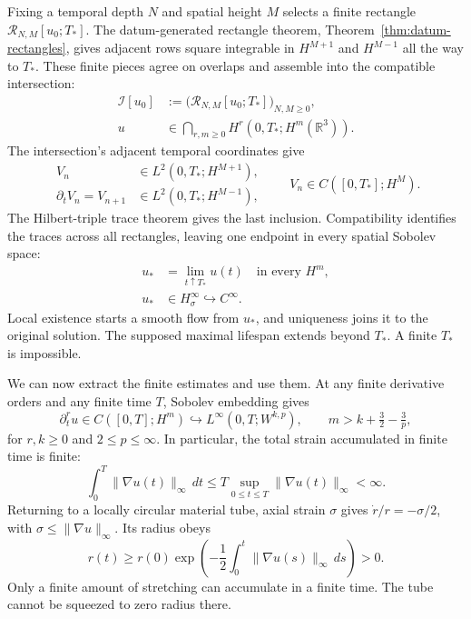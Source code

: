 Fixing a temporal depth \(N\) and spatial height \(M\) selects a finite
rectangle \(\mathcal R_{N,M}[u_0;T_*]\). The datum-generated rectangle
theorem, Theorem~\ref{thm:datum-rectangles}, gives adjacent rows square
integrable in \(H^{M+1}\) and \(H^{M-1}\) all the way to \(T_*\).
These finite pieces agree
on overlaps and assemble into the compatible intersection:
\[
 \begin{aligned}
 \mathcal I[u_0]
 &:=\bigl(\mathcal R_{N,M}[u_0;T_*]\bigr)_{N,M\ge0},\\
 u&\in\bigcap_{r,m\ge0}H^r(0,T_*;H^m(\mathbb R^3)).
 \end{aligned}
\]
The intersection's adjacent temporal coordinates give
\[
 \begin{aligned}
 V_n&\in L^2(0,T_*;H^{M+1}),\\
 \partial_tV_n=V_{n+1}&\in L^2(0,T_*;H^{M-1}),
 \end{aligned}
 \qquad
 V_n\in C([0,T_*];H^M).
\]
The Hilbert-triple trace theorem gives the last inclusion. Compatibility
identifies the traces across all rectangles, leaving one endpoint in every
spatial Sobolev space:
\[
 \begin{aligned}
 u_*&=\lim_{t\uparrow T_*}u(t)\quad\text{in every }H^m,\\
 u_*&\in H^\infty_\sigma\hookrightarrow C^\infty.
 \end{aligned}
\]
Local existence starts a smooth flow from \(u_*\), and uniqueness joins
it to the original solution. The supposed maximal lifespan extends
beyond \(T_*\). A finite \(T_*\) is impossible.

We can now extract the finite estimates and use them. At any finite
derivative orders and any finite time \(T\), Sobolev embedding gives
\[
 \partial_t^ru\in C([0,T];H^m)
 \hookrightarrow L^\infty(0,T;W^{k,p}),
 \qquad m>k+\tfrac32-\tfrac3p,
\]
for \(r,k\ge0\) and \(2\le p\le\infty\). In particular, the total
strain accumulated in finite time is finite:
\[
 \int_0^T\|\nabla u(t)\|_\infty\,dt
 \le T\sup_{0\le t\le T}\|\nabla u(t)\|_\infty<\infty.
\]
Returning to a locally circular material tube, axial strain
\(\sigma\) gives \(\dot r/r=-\sigma/2\), with
\(\sigma\le\|\nabla u\|_\infty\). Its radius obeys
\[
 r(t)\ge r(0)\exp\!\left(
 -\frac12\int_0^t\|\nabla u(s)\|_\infty\,ds
 \right)>0.
\]
Only a finite amount of stretching can accumulate in a finite time.
The tube cannot be squeezed to zero radius there.

\endgroup
